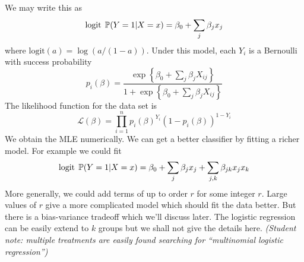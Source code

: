We may write this as
\[
\text{logit} \; \operatorname{\mathbb{P}}(Y = 1 | X = x) = \beta_{0} + \sum_{j} \beta_{j} x_{j}
\]
where \(\text{logit}(a) = \log (a / (1 - a))\). Under this model, each
\(Y_{i}\) is a Bernoulli with success probability
\[
p_{i}(\beta) = \frac{\exp \left\{ \beta_{0} + \sum_{j} \beta_{j} X_{ij} \right\} }{1 + \exp \left\{ \beta_{0} + \sum_{j} \beta_{j} X_{ij} \right\} }
\]
The likelihood function for the data set is
\[
\mathcal{L}(\beta) = \prod_{i=1}^{n} p_{i}(\beta)^{Y_{i}} (1 - p_{i}(\beta))^{1 - Y_{i}}
\]
We obtain the MLE numerically.
We can get a better classifier by fitting a richer model. For example we
could fit
\[
\text{logit} \; \operatorname{\mathbb{P}}(Y = 1 | X = x) = \beta_{0} + \sum_{j} \beta_{j} x_{j} + \sum_{j, k} \beta_{jk} x_{j} x_{k}
\]
More generally, we could add terms of up to order \(r\) for some integer
\(r\). Large values of \(r\) give a more complicated model which should
fit the data better. But there is a bias-variance tradeoff which we'll
discuss later.
The logistic regression can be easily extend to \(k\) groups but we
shall not give the details here.
\emph{(Student note: multiple treatments are easily found searching for
``multinomial logistic regression'')}

